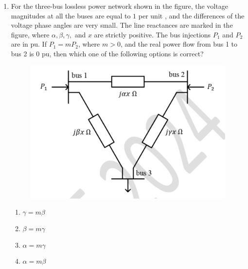\documentclass[journal,12pt,onecolumn]{IEEEtran}
\theoremstyle{remark}
\begin{document}
\begin{enumerate}[start=1, label=Q.\arabic*]
    \item For the three-bus lossless power network shown in the figure, the voltage magnitudes at all the buses are equal to $1$ per unit , and the differences of the voltage phase angles are very small. The line reactances are marked in the figure, where $\alpha, \beta, \gamma,$ and $x$ are strictly positive. The bus injections $P_1$ and $P_2$ are in pu. If $P_1 = mP_2$, where $m > 0$, and the real power flow from bus 1 to bus 2 is $0$ pu, then which one of the following options is correct?
    \begin{figure}[H]
        \includegraphics[width=0.6\columnwidth]{Figures/q41.png}
        \centering
        \caption{}
    \end{figure}
    \begin{enumerate}
        \item $\gamma = m\beta$
        \item $\beta = m\gamma$
        \item $\alpha = m\gamma$
        \item $\alpha = m\beta$
    \end{enumerate}

    \hfill{}


\end{enumerate}
\end{document}
